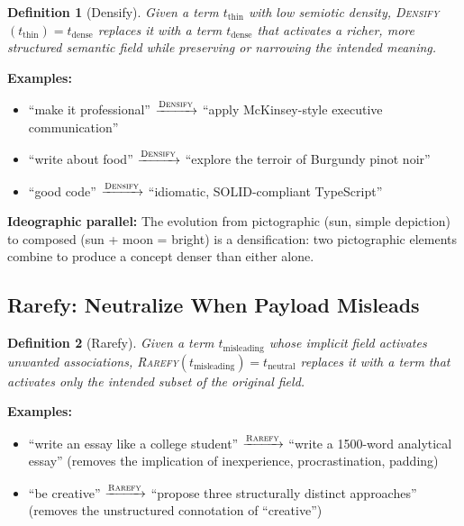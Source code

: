 \documentclass[12pt,a4paper]{article}
\newtheorem{definition}{Definition}[section]
\begin{document}
\begin{definition}[Densify]
Given a term $t_{\text{thin}}$ with low semiotic density, \textsc{Densify}$(t_{\text{thin}}) = t_{\text{dense}}$ replaces it with a term $t_{\text{dense}}$ that activates a richer, more structured semantic field while preserving or narrowing the intended meaning.
\end{definition}

\textbf{Examples:}
\begin{itemize}
  \item ``make it professional'' $\xrightarrow{\textsc{Densify}}$ ``apply McKinsey-style executive communication''
  \item ``write about food'' $\xrightarrow{\textsc{Densify}}$ ``explore the terroir of Burgundy pinot noir''
  \item ``good code'' $\xrightarrow{\textsc{Densify}}$ ``idiomatic, SOLID-compliant TypeScript''
\end{itemize}

\textbf{Ideographic parallel:}
The evolution from pictographic  (sun, simple depiction) to composed  (sun + moon = bright) is a densification: two pictographic elements combine to produce a concept denser than either alone.

\subsection{Rarefy: Neutralize When Payload Misleads}
\label{subsec:rarefy}

\begin{definition}[Rarefy]
Given a term $t_{\text{misleading}}$ whose implicit field activates unwanted associations, \textsc{Rarefy}$(t_{\text{misleading}}) = t_{\text{neutral}}$ replaces it with a term that activates only the intended subset of the original field.
\end{definition}

\textbf{Examples:}
\begin{itemize}
  \item ``write an essay like a college student'' $\xrightarrow{\textsc{Rarefy}}$ ``write a 1500-word analytical essay'' (removes the implication of inexperience, procrastination, padding)
  \item ``be creative'' $\xrightarrow{\textsc{Rarefy}}$ ``propose three structurally distinct approaches'' (removes the unstructured connotation of ``creative'')
\end{itemize}
\end{document}

